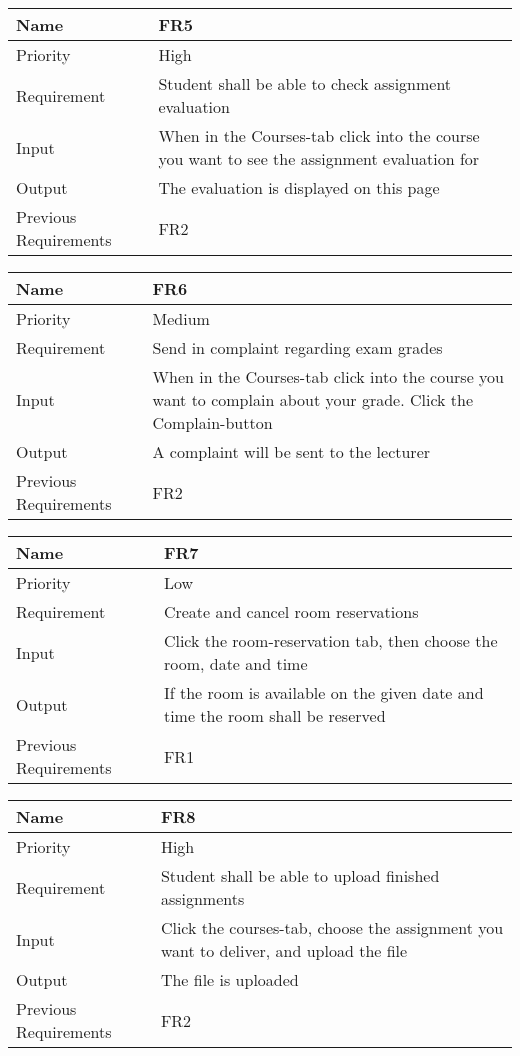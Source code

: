 \begin{tabularx}{\textwidth}{|l|X|}
  \hline
  Name & FR5 \\ \hline
  Priority & High \\ \hline
  Requirement & Student shall be able to check assignment evaluation \\ \hline
  Input & When in the Courses-tab click into the course you want to see the assignment evaluation for \\ \hline
  Output & The evaluation is displayed on this page \\ \hline
  Previous Requirements & FR2 \\ \hline
\end{tabularx}

\begin{tabularx}{\textwidth}{|l|X|}
  \hline
  Name & FR6 \\ \hline
  Priority & Medium \\ \hline
  Requirement & Send in complaint regarding exam grades \\ \hline
  Input & When in the Courses-tab click into the course you want to complain about your grade. Click the Complain-button \\ \hline
  Output & A complaint will be sent to the lecturer \\ \hline
  Previous Requirements & FR2 \\ \hline
\end{tabularx}

\begin{tabularx}{\textwidth}{|l|X|}
  \hline
  Name & FR7 \\ \hline
  Priority & Low \\ \hline
  Requirement & Create and cancel room reservations \\ \hline
  Input & Click the room-reservation tab, then choose the room, date and time \\ \hline
  Output & If the room is available on the given date and time the room shall be reserved \\ \hline
  Previous Requirements & FR1 \\ \hline
\end{tabularx}

\begin{tabularx}{\textwidth}{|l|X|}
  \hline
  Name & FR8 \\ \hline
  Priority & High \\ \hline
  Requirement & Student shall be able to upload finished assignments \\ \hline
  Input & Click the courses-tab, choose the assignment you want to deliver, and upload the file \\ \hline
  Output & The file is uploaded \\ \hline
  Previous Requirements & FR2 \\ \hline
\end{tabularx}

